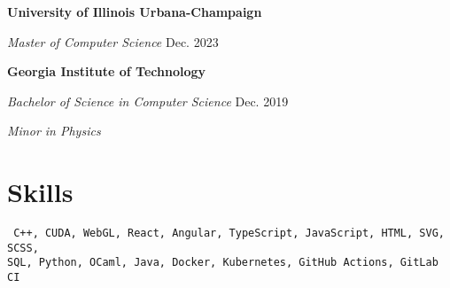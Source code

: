 \documentclass[11pt]{article}
\begin{document}
\vspace{1em}
\textbf{University of Illinois Urbana-Champaign}

\textit{Master of Computer Science} \hfill Dec. 2023

\vspace{1em}
\textbf{Georgia Institute of Technology} 

\textit{Bachelor of Science in Computer Science} \hfill Dec. 2019

\textit{Minor in Physics}

\section*{\sc Skills}

\vspace{1em}
\tt
C++, CUDA, WebGL, React, Angular, TypeScript, JavaScript, HTML, SVG, SCSS,\\
SQL, Python, OCaml, Java, Docker, Kubernetes, GitHub Actions, GitLab CI
\end{document}
